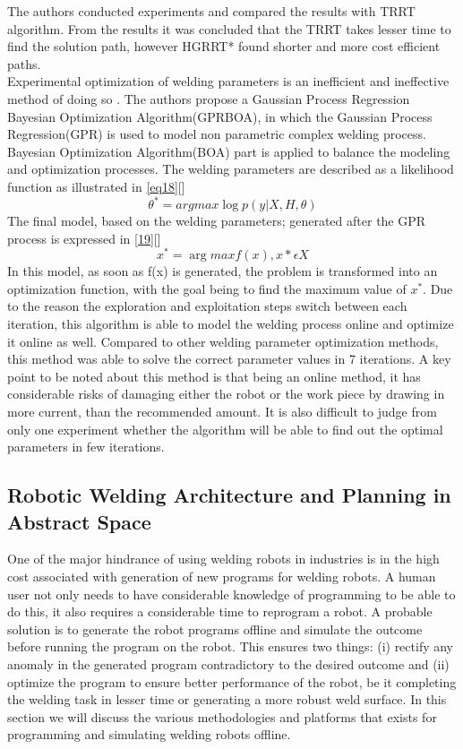 The authors conducted experiments and compared the results with TRRT algorithm. From the results it was concluded that the TRRT takes lesser time to find the solution path, however HGRRT* found shorter and more cost efficient paths. \\
Experimental optimization of welding parameters is an inefficient and ineffective method of doing so \citet{Sterling2016}. The authors propose a Gaussian Process Regression Bayesian Optimization Algorithm(GPRBOA), in which the Gaussian Process Regression(GPR) is used to model non parametric complex welding process. Bayesian Optimization Algorithm(BOA) part is applied to balance the modeling and optimization processes. The welding parameters are described as a likelihood function as illustrated in \eqref{eq18}[\citet{Sterling2016}]
\begin{equation}
\label{eq18}
\theta^{*} = argmax \log p(y|X,H,\theta)
\end{equation}
The final model, based on the welding parameters; generated after the GPR process is expressed in \eqref{19}[\citet{Sterling2016}]
\begin{equation}
\label{eq19}
x^{*} = \arg max f(x), x* \epsilon X
\end{equation}
In this model, as soon as f(x) is generated, the problem is transformed into an optimization function, with the goal being to find the maximum value of $x^{*}$. Due to the reason the exploration and exploitation steps switch between each iteration, this algorithm is able to model the welding process online and optimize it online as well. Compared to other welding parameter optimization methods, this method was able to solve the correct parameter values in 7 iterations. A key point to be noted about this method is that being an online method, it has considerable risks of damaging either the robot or the work piece by drawing in more current, than the recommended amount. It is also difficult to judge from only one experiment whether the algorithm will be able to find out the optimal parameters in few iterations.
\newpage
\subsection{Robotic Welding Architecture and Planning in Abstract Space}
One of the major hindrance of using welding robots in industries is in the high cost associated with generation of new programs for welding robots\citet{Larkin2016}. A human user not only needs to have considerable knowledge of programming to be able to do this, it also requires a considerable time to reprogram a robot. A probable solution is to generate the robot programs offline and simulate the outcome before running the program on the robot. This ensures two things: (i) rectify any anomaly in the generated program contradictory to the desired outcome and (ii) optimize the program to ensure better performance of the robot, be it completing the welding task in lesser time or generating a more robust weld surface. In this section we  will discuss the various methodologies and platforms that exists for programming and simulating welding robots offline. 
